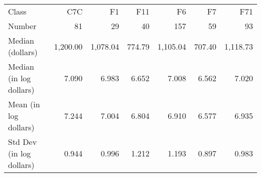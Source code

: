 \begin{tabular}{lrrrrrr}
     Class &        C7C &        F1  &        F11 &        F6  &        F7  &        F71 \\

    Number &         81 &         29 &         40 &        157 &         59 &         93 \\

Median (dollars) &   1,200.00 &   1,078.04 &     774.79 &   1,105.04 &     707.40 &   1,118.73 \\

Median (in log dollars) &      7.090 &      6.983 &      6.652 &      7.008 &      6.562 &      7.020 \\

Mean (in log dollars) &      7.244 &      7.004 &      6.804 &      6.910 &      6.577 &      6.935 \\

Std Dev (in log dollars) &      0.944 &      0.996 &      1.212 &      1.193 &      0.897 &      0.983 \\

\end{tabular}  

